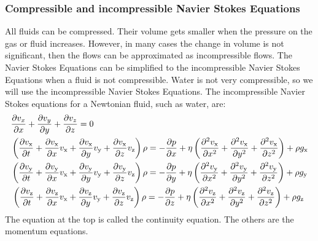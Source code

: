 \documentclass{article}
\begin{document}
\subsubsection{Compressible and incompressible Navier Stokes Equations}
All fluids can be compressed. Their volume gets smaller when the pressure on the gas or fluid increases. However, in many cases the change in volume is not significant, then the flows can be approximated as incompressible flows. The Navier Stokes Equations can be simplified to the incompressible Navier Stokes Equations when a fluid is not compressible. Water is not very compressible\cite{NSE features}, so we will use the incompressible Navier Stokes Equations. The incompressible Navier Stokes equations for a Newtonian fluid, such as water, are:\cite{Navier Stokes incompressible} \cite{NASA NSE}
\begin{equation}
\begin{aligned}
&\pdv{v_{x}}{x}+\pdv{v_{y}}{y}+\pdv{v_{z}}{z}=0\\
&\left(\frac{\partial v_{\mathrm{x}}}{\partial t}+\frac{\partial v_{\mathrm{x}}}{\partial x} v_{\mathrm{x}}+\frac{\partial v_{\mathrm{x}}}{\partial y} v_{\mathrm{y}}+\frac{\partial v_{\mathrm{x}}}{\partial z} v_{\mathrm{z}}\right) \rho=-\frac{\partial p}{\partial x}+\eta\left(\frac{\partial^{2} v_{\mathrm{x}}}{\partial x^{2}}+\frac{\partial^{2} v_{\mathrm{x}}}{\partial y^{2}}+\frac{\partial^{2} v_{\mathrm{x}}}{\partial z^{2}}\right)+\rho g_{\mathrm{x}}\\
&\left(\frac{\partial v_{\mathrm{y}}}{\partial t}+\frac{\partial v_{\mathrm{y}}}{\partial x} v_{\mathrm{x}}+\frac{\partial v_{\mathrm{y}}}{\partial y} v_{\mathrm{y}}+\frac{\partial v_{\mathrm{y}}}{\partial z} v_{\mathrm{z}}\right) \rho=-\frac{\partial p}{\partial y}+\eta\left(\frac{\partial^{2} v_{\mathrm{y}}}{\partial x^{2}}+\frac{\partial^{2} v_{\mathrm{y}}}{\partial y^{2}}+\frac{\partial^{2} v_{\mathrm{y}}}{\partial z^{2}}\right)+\rho g_{\mathrm{y}}\\
&\left . \left(\frac{\partial v_{\mathrm{z}}}{\partial t}+\frac{\partial v_{\mathrm{z}}}{\partial x} v_{\mathrm{x}}+\frac{\partial v_{\mathrm{z}}}{\partial y} v_{\mathrm{y}}+\frac{\partial v_{\mathrm{z}}}{\partial z} v_{\mathrm{z}}\right) \rho=-\frac{\partial p}{\partial z}+\eta\left(\frac{\partial^{2} v_{\mathrm{z}}}{\partial x^{2}}+\frac{\partial^{2} v_{\mathrm{z}}}{\partial y^{2}}+\frac{\partial^{2} v_{\mathrm{z}}}{\partial z^{2}}\right)+\rho g_{\mathrm{z}}\right .
\end{aligned}
\label{NSE compressible}
\end{equation}
The equation at the top is called the continuity equation. The others are the momentum equations.
\end{document}

